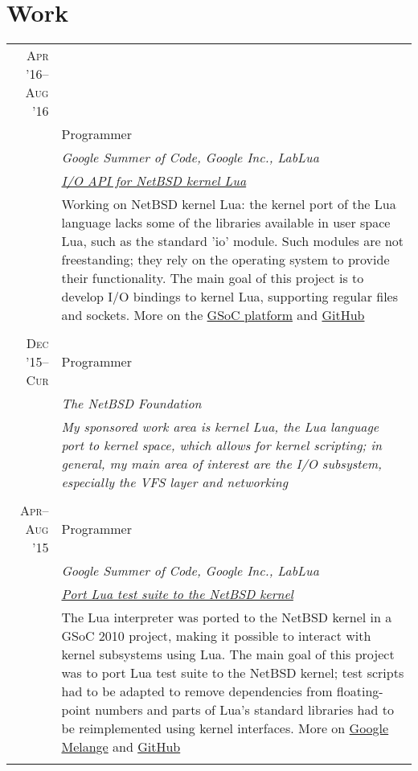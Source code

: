 \documentclass[a4paper,10pt]{article}
\begin{document}
\section{Work}
\begin{tabular}{r|p{11cm}}

  \textsc{Apr '16--Aug '16}\\
  & Programmer \\
  &\emph{Google Summer of Code, Google Inc., LabLua}\\
  &\emph{\footnotesize{\href{https://goo.gl/g8Mb2M}{I/O API for NetBSD kernel Lua}}}\\
  &\footnotesize{Working on NetBSD kernel Lua: the kernel port of the Lua 
  language lacks some of the libraries available in user space Lua, such as
  the standard 'io' module. Such modules are not freestanding; they rely on
  the operating system to provide their functionality. The main goal of this
  project is to develop I/O bindings to kernel Lua, supporting regular files
  and sockets. More on the \href{https://goo.gl/g8Mb2M}{GSoC platform} and
  \href{https://GitHub.com/salazar/luaio}{GitHub}}
  \\\multicolumn{2}{c}{} \\

  \textsc{Dec '15--Cur}
  & Programmer \\
  &\emph{The NetBSD Foundation}\\
  &\emph{\footnotesize{My sponsored work area is kernel Lua, the Lua language
  port to kernel space, which allows for kernel scripting; in general, my main
  area of interest are the I/O subsystem, especially the VFS layer and networking}}
  \\\multicolumn{2}{c}{} \\
  
  \textsc{Apr--Aug '15}
  & Programmer \\
  &\emph{Google Summer of Code, Google Inc., LabLua}\\
  &\emph{\footnotesize{\href{https://goo.gl/xSl1bW}{Port Lua test
         suite to the NetBSD kernel}}}\\
  &\footnotesize{The Lua interpreter was ported to the NetBSD kernel in a GSoC 
   2010 project, making it possible to interact with kernel subsystems using
   Lua. The main goal of this project was to port Lua test suite to the NetBSD
   kernel; test scripts had to be adapted to remove dependencies from floating-
   point numbers and parts of Lua's standard libraries had to be reimplemented 
   using kernel interfaces. More on \href{https://goo.gl/xSl1bW}{Google Melange}
   and \href{https://GitHub.com/salazar/luatests}{GitHub}}
  \\\multicolumn{2}{c}{} \\


\end{tabular}
\end{document}
